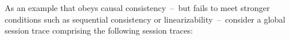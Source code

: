\documentclass[conference]{IEEEtran}
\begin{document}
	
	As an example that obeys causal consistency~--~but fails to meet stronger conditions such as sequential consistency or linearizability~--~consider a global session trace comprising the following session traces:
	
\end{document}
